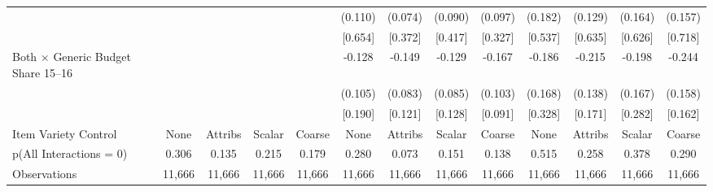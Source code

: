 \begin{tabular}{l*{12}{c}}
                     &            &            &            &            &     (0.110)&     (0.074)&     (0.090)&     (0.097)&     (0.182)&     (0.129)&     (0.164)&     (0.157)\\
                     &            &            &            &            &     [0.654]&     [0.372]&     [0.417]&     [0.327]&     [0.537]&     [0.635]&     [0.626]&     [0.718]\\\addlinespace
Both $\times$ Generic Budget Share 15--16&            &            &            &            &      -0.128&      -0.149&      -0.129&      -0.167&      -0.186&      -0.215&      -0.198&      -0.244\\
                     &            &            &            &            &     (0.105)&     (0.083)&     (0.085)&     (0.103)&     (0.168)&     (0.138)&     (0.167)&     (0.158)\\
                     &            &            &            &            &     [0.190]&     [0.121]&     [0.128]&     [0.091]&     [0.328]&     [0.171]&     [0.282]&     [0.162]\\
\midrule
Item Variety Control &        None&     Attribs&      Scalar&      Coarse&        None&     Attribs&      Scalar&      Coarse&        None&     Attribs&      Scalar&      Coarse\\
p(All Interactions = 0)&       0.306&       0.135&       0.215&       0.179&       0.280&       0.073&       0.151&       0.138&       0.515&       0.258&       0.378&       0.290\\
Observations         &      11,666&      11,666&      11,666&      11,666&      11,666&      11,666&      11,666&      11,666&      11,666&      11,666&      11,666&      11,666\\
\bottomrule
\end{tabular}
